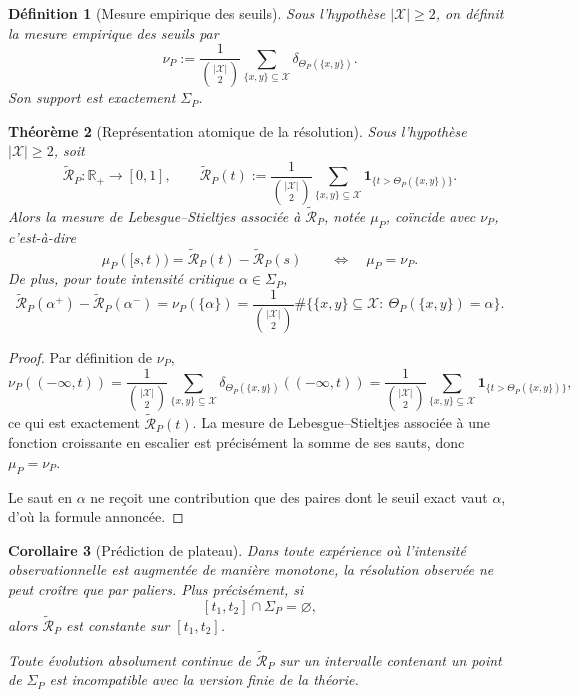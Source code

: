 \documentclass[11pt,a4paper,openany]{book}
\newtheorem{definition}{Définition}[chapter]
\newtheorem{theorem}[definition]{Théorème}
\newtheorem{corollary}[definition]{Corollaire}
\begin{document}
\begin{definition}[Mesure empirique des seuils]
Sous l'hypothèse \(|\mathcal X|\ge2\), on définit la mesure empirique des seuils par
\[
\nu_P
:=
\frac{1}{\binom{|\mathcal X|}{2}}
\sum_{\{x,y\}\subseteq\mathcal X}\delta_{\Theta_P(\{x,y\})}.
\]
Son support est exactement \(\Sigma_P\).
\end{definition}

\begin{theorem}[Représentation atomique de la résolution]
Sous l'hypothèse \(|\mathcal X|\ge2\), soit
\[
\widetilde{\mathcal R}_P:\mathbb R_+\longrightarrow [0,1],
\qquad
\widetilde{\mathcal R}_P(t)
:=
\frac{1}{\binom{|\mathcal X|}{2}}
\sum_{\{x,y\}\subseteq\mathcal X}
\mathbf 1_{\{t>\Theta_P(\{x,y\})\}}.
\]
Alors la mesure de Lebesgue--Stieltjes associée à \(\widetilde{\mathcal R}_P\), notée \(\mu_P\), coïncide avec \(\nu_P\), c'est-à-dire
\[
\mu_P([s,t))=\widetilde{\mathcal R}_P(t)-\widetilde{\mathcal R}_P(s)
\qquad\Longleftrightarrow\quad
\mu_P=\nu_P.
\]
De plus, pour toute intensité critique \(\alpha\in\Sigma_P\),
\[
\widetilde{\mathcal R}_P(\alpha^+)-\widetilde{\mathcal R}_P(\alpha^-)
=
\nu_P(\{\alpha\})
=
\frac{1}{\binom{|\mathcal X|}{2}}
\#\bigl\{\{x,y\}\subseteq\mathcal X:\ \Theta_P(\{x,y\})=\alpha\bigr\}.
\]
\end{theorem}

\begin{proof}
Par définition de \(\nu_P\),
\[
\nu_P((-\infty,t))
=
\frac{1}{\binom{|\mathcal X|}{2}}
\sum_{\{x,y\}\subseteq\mathcal X}
\delta_{\Theta_P(\{x,y\})}((-\infty,t))
=
\frac{1}{\binom{|\mathcal X|}{2}}
\sum_{\{x,y\}\subseteq\mathcal X}
\mathbf 1_{\{t>\Theta_P(\{x,y\})\}},
\]
ce qui est exactement \(\widetilde{\mathcal R}_P(t)\). La mesure de Lebesgue--Stieltjes associée à une fonction croissante en escalier est précisément la somme de ses sauts, donc \(\mu_P=\nu_P\).

Le saut en \(\alpha\) ne reçoit une contribution que des paires dont le seuil exact vaut \(\alpha\), d'où la formule annoncée.
\end{proof}

\begin{corollary}[Prédiction de plateau]
Dans toute expérience où l'intensité observationnelle est augmentée de manière monotone, la résolution observée ne peut croître que par paliers. Plus précisément, si
\[
[t_1,t_2]\cap\Sigma_P=\varnothing,
\]
alors \(\widetilde{\mathcal R}_P\) est constante sur \([t_1,t_2]\).

Toute évolution absolument continue de \(\widetilde{\mathcal R}_P\) sur un intervalle contenant un point de \(\Sigma_P\) est incompatible avec la version finie de la théorie.
\end{corollary}
\end{document}
